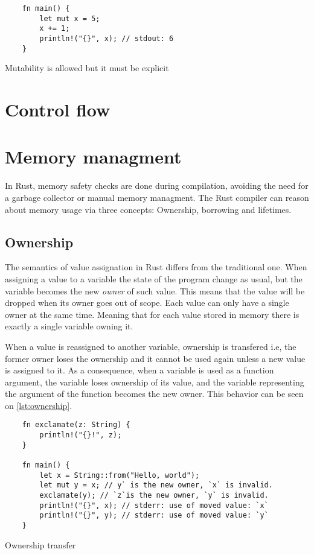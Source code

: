 \begin{listing}
	\begin{verbatim}
    fn main() {
        let mut x = 5;
        x += 1;
        println!("{}", x); // stdout: 6 
    }
	\end{verbatim}
  \caption{Mutability is allowed but it must be explicit}
  \label{lst:mutable}
\end{listing}

\section{Control flow}

\section{Memory managment}
In Rust, memory safety checks are done during compilation, avoiding the need for a garbage collector or manual memory managment. The Rust compiler can reason about memory usage via three concepts: Ownership, borrowing and lifetimes.

\subsection{Ownership}
The semantics of value assignation in Rust differs from the traditional one. When assigning a value to a variable the state of the program change as usual, but the variable becomes the new \textit{owner} of such value. This means that the value will be dropped when its owner goes out of scope. Each value can only have a single owner at the same time. Meaning that for each value stored in memory there is exactly a single variable owning it. 

When a value is reassigned to another variable, ownership is transfered i.e, the former owner loses the ownership and it cannot be used again unless a new value is assigned to it. As a consequence, when a variable is used as a function argument, the variable loses ownership of its value, and the variable representing the argument of the function becomes the new owner. This behavior can be seen on \ref{lst:ownership}.

\begin{listing}
	\begin{verbatim}
    fn exclamate(z: String) {
        println!("{}!", z);
    }

    fn main() {
        let x = String::from("Hello, world");
        let mut y = x; // y` is the new owner, `x` is invalid.
        exclamate(y); // `z`is the new owner, `y` is invalid.
        println!("{}", x); // stderr: use of moved value: `x`
        println!("{}", y); // stderr: use of moved value: `y`
    }
	\end{verbatim}
  \caption{Ownership transfer}
  \label{lst:ownership}
\end{listing}

